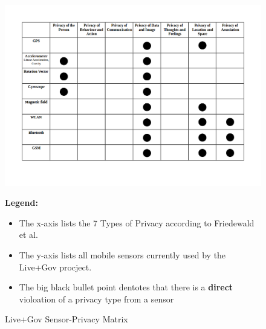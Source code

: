 \begin{figure}
\centering
\includegraphics{diagrams/png/sensor-privacy-matrix.png}


\begin{flushleft}
\scriptsize
\textbf{Legend:}
\begin{itemize}
\itemsep1pt\parskip0pt
\item
  The x-axis lists the 7 Types of Privacy according to Friedewald et al.
\item
  The y-axis lists all mobile sensors currently used by the Live+Gov
  procject.
\item
  The big black bullet point dentotes that there is a \textbf{direct}
  violoation of a privacy type from a sensor
\end{itemize}
\end{flushleft}

\caption{Live+Gov Sensor-Privacy Matrix}
\label{figure:Live+Gov Sensor-Privacy Matrix}
\end{figure}
